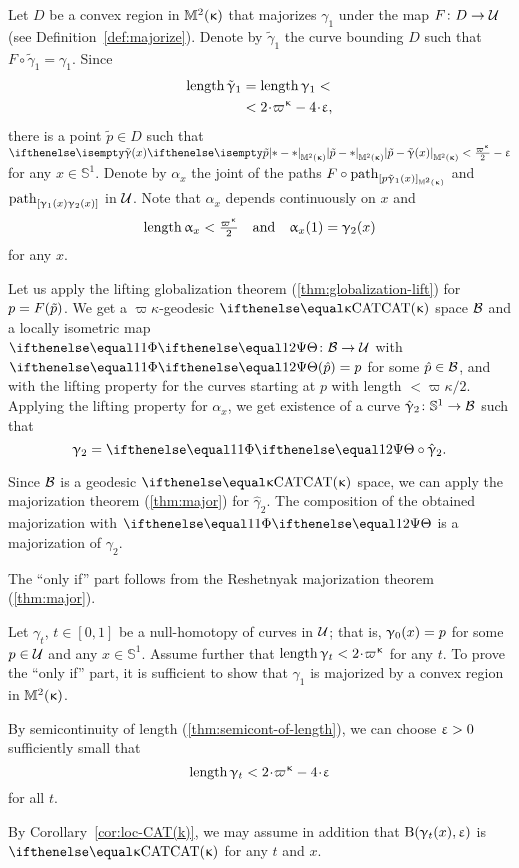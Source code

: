  Let $D$ be a convex region in $\mathbb{M}_{{}}^{2}({\upkappa})$ that majorizes $\gamma_1$ under the map $F\:D\to\spc{U}$ 
(see Definition~\ref{def:majorize}).
Denote by $\tilde \gamma_1$ 
the curve bounding $D$ 
such that $F\circ\tilde \gamma_1=\gamma_1$.
Since  
\begin{align*}
\length\tilde \gamma_1
&=
\length\gamma_1
<
\\
&<
2\cdot\varpi\kappa-4\cdot\eps,
\end{align*}
there is a point $\tilde p\in D$ such that 
$\dist{\tilde p}{\tilde \gamma(x)}{\Lob2\kappa}<\tfrac{\varpi\kappa}2-\eps$
for any $x\in\mathbb{S}^1$.
Denote by $\alpha_x$ the joint of the paths $F\circ\geodpath_{[p\tilde \gamma_1(x)]_{\Lob2\kappa}}$ 
and  $\mathrm{path}_{[\upgamma_1(x)\upgamma_2(x)]}$ in $\mathcal{U}$.
Note that $\alpha_x$ depends continuously on $x$ and
$$\length\alpha_x<\tfrac{\varpi\kappa}{2}\quad \text{and}\quad \alpha_x(1)=\gamma_2(x)$$ 
for any $x$.

Let us apply the lifting globalization theorem
(\ref{thm:globalization-lift}) for $p\z=F(\tilde p)$.
We get a $\varpi\kappa$-geodesic $\CAT\kappa$ space $\mathcal{B}$
and a locally isometric map $\map\:\spc{B}\to\spc{U}$
with $\map(\hat p)=p$ for some $\hat p \in \spc{B}$, and with the lifting property for the curves starting at $p$ with length $<\varpi\kappa/2$.
Applying the lifting property for $\alpha_x$, 
we get existence of a curve $\hat\gamma_2\:\mathbb{S}^1\to \spc{B}$ such that
$$\gamma_2=\map\circ\hat\gamma_2.$$

Since $\mathcal{B}$ is a geodesic $\CAT\kappa$ space, we can apply the majorization theorem (\ref{thm:major}) for $\hat\gamma_2$.
The composition of the obtained majorization with $\map$ is a majorization of $\gamma_2$.
\qeds

The ``only if'' part follows from the Reshetnyak majorization theorem (\ref{thm:major}).

Let  $\gamma_t$, $t\in[0,1]$ 
be a null-homotopy of curves in $\mathcal{U}$;
that is, $\gamma_0(x)\z=p$ for some $p\in \spc{U}$
and any $x\in\mathbb{S}^1$.
Assume further that $\length \gamma_t\z<2\cdot\varpi\kappa$ for any $t$.
To prove the ``only if'' part, it is sufficient to show that $\gamma_1$ is majorized by a convex region in $\mathbb{M}_{{}}^{2}({\upkappa})$. 

By semicontinuity of length (\ref{thm:semicont-of-length}),
we can choose  $\upvarepsilon>0$ sufficiently small that
$$\length \gamma_t<2\cdot\varpi\kappa-4\cdot\eps$$
for all $t$.

By Corollary~\ref{cor:loc-CAT(k)},
we may assume in addition that
$\mathrm{B}{}(\upgamma_t(x),\upvarepsilon)$ is $\CAT\kappa$ 
for any $t$ and $x$.

